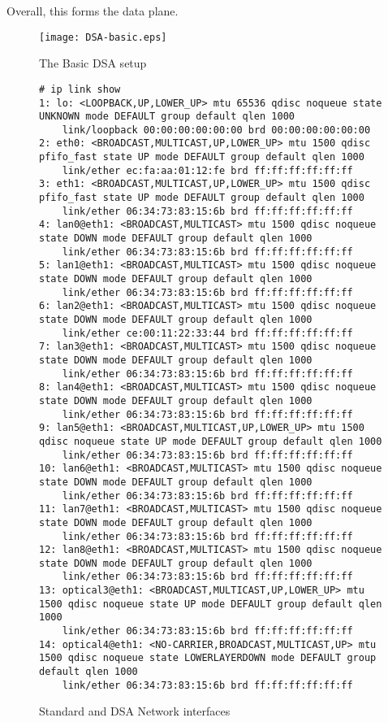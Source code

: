 \documentclass[letterpaper]{article}
\begin{document}
Overall, this forms the data plane.

\begin{figure}[ht]
  \centering
  \texttt{[image: DSA-basic.eps]}
  \caption{The Basic DSA setup}
  \label{dsa-basic}
\end{figure}

\begin{figure*}
  \begin{minipage}{\textwidth}
    \tiny
\begin{verbatim}
# ip link show
1: lo: <LOOPBACK,UP,LOWER_UP> mtu 65536 qdisc noqueue state UNKNOWN mode DEFAULT group default qlen 1000
    link/loopback 00:00:00:00:00:00 brd 00:00:00:00:00:00
2: eth0: <BROADCAST,MULTICAST,UP,LOWER_UP> mtu 1500 qdisc pfifo_fast state UP mode DEFAULT group default qlen 1000
    link/ether ec:fa:aa:01:12:fe brd ff:ff:ff:ff:ff:ff
3: eth1: <BROADCAST,MULTICAST,UP,LOWER_UP> mtu 1500 qdisc pfifo_fast state UP mode DEFAULT group default qlen 1000
    link/ether 06:34:73:83:15:6b brd ff:ff:ff:ff:ff:ff
4: lan0@eth1: <BROADCAST,MULTICAST> mtu 1500 qdisc noqueue state DOWN mode DEFAULT group default qlen 1000
    link/ether 06:34:73:83:15:6b brd ff:ff:ff:ff:ff:ff
5: lan1@eth1: <BROADCAST,MULTICAST> mtu 1500 qdisc noqueue state DOWN mode DEFAULT group default qlen 1000
    link/ether 06:34:73:83:15:6b brd ff:ff:ff:ff:ff:ff
6: lan2@eth1: <BROADCAST,MULTICAST> mtu 1500 qdisc noqueue state DOWN mode DEFAULT group default qlen 1000
    link/ether ce:00:11:22:33:44 brd ff:ff:ff:ff:ff:ff
7: lan3@eth1: <BROADCAST,MULTICAST> mtu 1500 qdisc noqueue state DOWN mode DEFAULT group default qlen 1000
    link/ether 06:34:73:83:15:6b brd ff:ff:ff:ff:ff:ff
8: lan4@eth1: <BROADCAST,MULTICAST> mtu 1500 qdisc noqueue state DOWN mode DEFAULT group default qlen 1000
    link/ether 06:34:73:83:15:6b brd ff:ff:ff:ff:ff:ff
9: lan5@eth1: <BROADCAST,MULTICAST,UP,LOWER_UP> mtu 1500 qdisc noqueue state UP mode DEFAULT group default qlen 1000
    link/ether 06:34:73:83:15:6b brd ff:ff:ff:ff:ff:ff
10: lan6@eth1: <BROADCAST,MULTICAST> mtu 1500 qdisc noqueue state DOWN mode DEFAULT group default qlen 1000
    link/ether 06:34:73:83:15:6b brd ff:ff:ff:ff:ff:ff
11: lan7@eth1: <BROADCAST,MULTICAST> mtu 1500 qdisc noqueue state DOWN mode DEFAULT group default qlen 1000
    link/ether 06:34:73:83:15:6b brd ff:ff:ff:ff:ff:ff
12: lan8@eth1: <BROADCAST,MULTICAST> mtu 1500 qdisc noqueue state DOWN mode DEFAULT group default qlen 1000
    link/ether 06:34:73:83:15:6b brd ff:ff:ff:ff:ff:ff
13: optical3@eth1: <BROADCAST,MULTICAST,UP,LOWER_UP> mtu 1500 qdisc noqueue state UP mode DEFAULT group default qlen 1000
    link/ether 06:34:73:83:15:6b brd ff:ff:ff:ff:ff:ff
14: optical4@eth1: <NO-CARRIER,BROADCAST,MULTICAST,UP> mtu 1500 qdisc noqueue state LOWERLAYERDOWN mode DEFAULT group default qlen 1000
    link/ether 06:34:73:83:15:6b brd ff:ff:ff:ff:ff:ff
\end{verbatim}
  \end{minipage}
  \caption{Standard and DSA Network interfaces}
  \label{network-interfaces}
\end{figure*}
\end{document}

